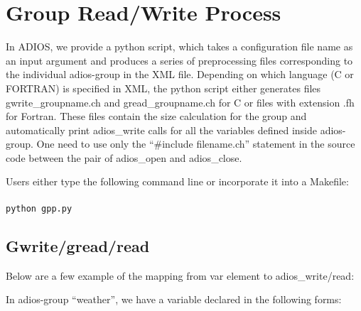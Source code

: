 \chapter{Group Read/Write Process}
\label{chapter-gpp}

In ADIOS, we provide a python script, which takes a configuration file name as 
an input argument and produces a series of preprocessing files corresponding to 
the individual adios-group in the XML file. Depending on which language (C or FORTRAN) 
is specified in XML, the python script either generates files gwrite\_groupname.ch 
and gread\_groupname.ch for C or files with extension .fh for Fortran. These files 
contain the size calculation for the group and automatically print adios\_write 
calls for all the variables defined inside adios-group. One need to use only the 
``\#include filename.ch'' statement in the source code between the pair of adios\_open 
and adios\_close.

Users either type the following command line or incorporate it into a Makefile:
\\
\\
\verb+python gpp.py+

\section{Gwrite/gread/read}

Below are a few example of the mapping from var element to adios\_write/read:

In adios-group ``weather'', we have a variable declared in the following forms:


